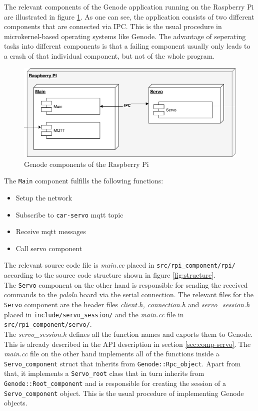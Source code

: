The relevant components of the Genode application running on the Raspberry Pi are illustrated in figure \ref{fig:pi-genode}. As one can see, the application consists of two different components that are connected via IPC. This is the usual procedure in microkernel-based operating systems like Genode. The advantage of seperating tasks into different components is that a failing component usually only leads to a crash of that individual component, but not of the whole program. \\

\begin{figure}[h]
    \centering
    \includegraphics[width=0.7\linewidth]{images/pi}
    \caption{Genode components of the Raspberry Pi}
    \label{fig:pi-genode}
\end{figure}

The \texttt{Main} component fulfills the following functions:

\begin{itemize}
    \item Setup the network
    \item Subscribe to \texttt{car-servo} mqtt topic
    \item Receive mqtt messages
    \item Call servo component
\end{itemize}

The relevant source code file is \textit{main.cc} placed in \texttt{src/rpi\_component/rpi/} according to the source code structure shown in figure \ref{fig:structure}. \\

The \texttt{Servo} component on the other hand is responsible for sending the received commands to the \textit{pololu} board via the serial connection. The relevant files for the \texttt{Servo} component are the header files \textit{client.h, connection.h} and \textit{servo\_session.h} placed in \texttt{include/servo\_session/} and the \textit{main.cc} file in \texttt{src/rpi\_component/servo/}. \\

The \textit{servo\_session.h} defines all the function names and exports them to Genode. This is already described in the API description in section \ref{sec:comp-servo}. The \textit{main.cc} file on the other hand implements all of the functions inside a \texttt{Servo\_component} struct that inherits from \texttt{Genode::Rpc\_object}. Apart from that, it implements a \texttt{Servo\_root} class that in turn inherits from \texttt{Genode::Root\_component} and is responsible for creating the session of a \texttt{Servo\_component} object. This is the usual procedure of implementing Genode objects. \\

